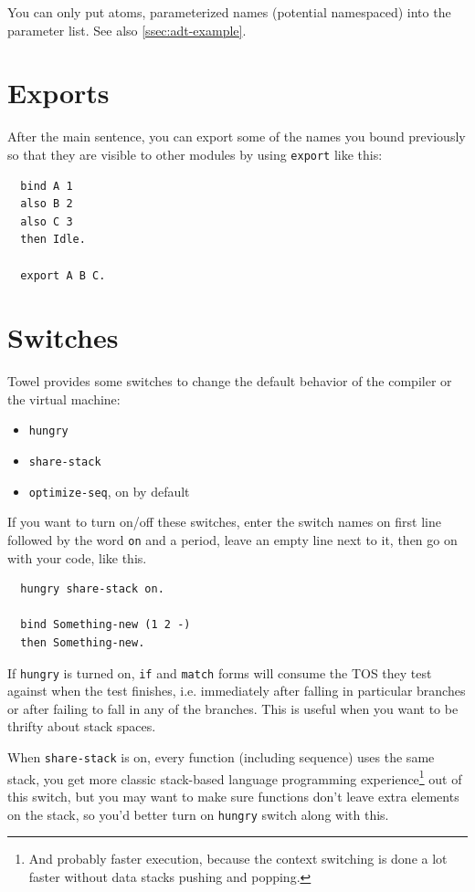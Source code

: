 \documentclass{book}
\begin{document}
You can only put atoms, parameterized names (potential namespaced) into the parameter list. See also \autoref{ssec:adt-example}.

\section{Exports}

After the main sentence, you can export some of the names you bound previously so that they are visible to other modules by using \texttt{export} like this:

\begin{verbatim}
  bind A 1
  also B 2
  also C 3
  then Idle.

  export A B C.
\end{verbatim}

\section{Switches}
\label{sec:switches}

Towel provides some switches to change the default behavior of the compiler or the virtual machine:
\begin{itemize}
\item \texttt{hungry}
\item \texttt{share-stack}
\item \texttt{optimize-seq}, on by default
\end{itemize}

If you want to turn on/off these switches, enter the switch names on first line followed by the word \texttt{on} and a period, leave an empty line next to it, then go on with your code, like this.

\begin{verbatim}
  hungry share-stack on.

  bind Something-new (1 2 -)
  then Something-new.
\end{verbatim}

If \texttt{hungry} is turned on, \texttt{if} and \texttt{match} forms will consume the TOS they test against when the test finishes, i.e. immediately after falling in particular branches or after failing to fall in any of the branches. This is useful when you want to be thrifty about stack spaces.

When \texttt{share-stack} is on, every function (including sequence) uses the same stack, you get more classic stack-based language programming experience\footnote{And probably faster execution, because the context switching is done a lot faster without data stacks pushing and popping.} out of this switch, but you may want to make sure functions don't leave extra elements on the stack, so you'd better turn on \texttt{hungry} switch along with this.
\end{document}

